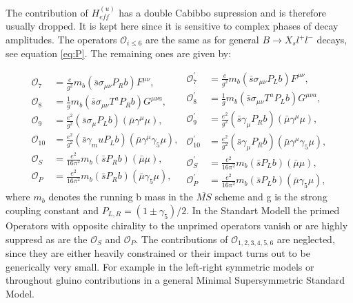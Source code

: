 \documentclass[english]{uzhpub}
\begin{document}
The contribution of $H_{eff}^{(u)}$ has a double Cabibbo supression and is therefore usually dropped. It is kept here since it is sensitive to complex phases of decay amplitudes. The operators $\mathcal{O}_{i \leq 6}$ are the same as for general $B \rightarrow X_s l^+l^-$ decays, see equation \ref{eq:P}.
The remaining ones are given by:

\begin{equation}
 \begin{split}
  \mathcal{O}_7 &= \frac{e}{g^2} m_b (\bar{s} \sigma_{\mu \nu} P_R b) F^{\mu \nu}, \\
  \mathcal{O}_8 &= \frac{1}{g} m_b (\bar{s} \sigma_{\mu \nu} T^a P_R b) G^{\mu \nu a}, \\
  \mathcal{O}_9 &= \frac{e^2}{g^2} (\bar{s} \sigma_\mu P_L b) (\bar{\mu} \gamma^\mu \mu), \\
  \mathcal{O}_{10} &= \frac{e^2}{g^2} (\bar{s} \gamma_mu P_L b) (\bar{\mu} \gamma^\mu \gamma_5 \mu), \\
  \mathcal{O}_S &= \frac{e^2}{16 \pi^2} m_b (\bar{s} P_R b) (\bar{\mu} \mu), \\
  \mathcal{O}_P &= \frac{e^2}{16 \pi^2} m_b (\bar{s} P_R b)( \bar{\mu} \gamma_5 \mu),
 \end{split}
 \begin{split}
  \mathcal{O}_7^\prime &= \frac{e}{g^2} m_b (\bar{s} \sigma_{\mu \nu} P_L b) F^{\mu \nu}, \\
  \mathcal{O}_8^\prime &= \frac{1}{g} m_b (\bar{s} \sigma_{\mu \nu} T^a P_L b) G^{\mu \nu a}, \\
  \mathcal{O}_9^\prime &= \frac{e^2}{g^2} (\bar{s} \gamma_\mu P_R b) (\bar{\mu} \gamma^\mu \mu), \\
  \mathcal{O}_{10}^\prime &= \frac{e^2}{g^2} (\bar{s} \gamma_\mu P_R b) (\bar{\mu} \gamma^\mu \gamma_5 \mu), \\
  \mathcal{O}_S^\prime &= \frac{e^2}{16 \pi^2} m_b (\bar{s} P_L b) (\bar{\mu} \mu), \\
  \mathcal{O}_P^\prime &= \frac{e^2}{16 \pi^2} m_b (\bar{s} P_L b) (\bar{\mu} \gamma_5 \mu),
 \end{split}
 \label{eq:P2}
\end{equation}
where $m_b$ denotes the running b mass in the $\overline{MS}$ scheme and g is the strong coupling constant and $P_{L,R} = ( 1 \pm \gamma_5)/2$. In the Standart Modell the primed Operators with opposite chirality to the unprimed operators vanish or are highly suppresd as are the $\mathcal{O}_S$ and $\mathcal{O}_P$. The contributions of $\mathcal{O}_{1,2,3,4,5,6}$ are neglected, since they are either heavily constrained or their impact turns out to be generically very small. For example in the left-right symmetric models or throughout gluino contributions in a general Minimal Supersymmetric Standard Model. \\
\end{document}
